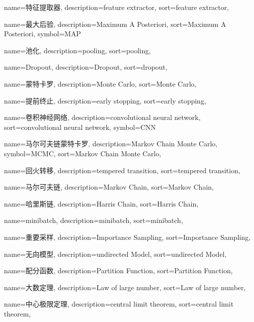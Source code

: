 {
  name=特征提取器,
  description={feature extractor},
  sort={feature extractor},
}

{
  name=最大后验,
  description={Maximum A Posteriori},
  sort={Maximum A Posteriori},
  symbol={MAP}
}

{
  name=池化,
  description={pooling},
  sort={pooling},
}

{
  name=Dropout,
  description={Dropout},
  sort={dropout},
}

{
  name=蒙特卡罗,
  description={Monte Carlo},
  sort={Monte Carlo},
}

{
  name=提前终止,
  description={early stopping},
  sort={early stopping},
}

{
  name=卷积神经网络,
  description={convolutional neural network},
  sort={convolutional neural network},
  symbol={CNN}
}

{
  name=马尔可夫链蒙特卡罗,
  description={Markov Chain Monte Carlo},
  symbol={MCMC},
  sort={Markov Chain Monte Carlo},
}

{
  name=回火转移,
  description={tempered transition},
  sort={tempered transition},
}

{
  name=马尔可夫链,
  description={Markov Chain},
  sort={Markov Chain},
}

{
  name=哈里斯链,
  description={Harris Chain},
  sort={Harris Chain},
}

{
  name=minibatch,
  description={minibatch},
  sort={minibatch},
}

{
  name=重要采样,
  description={Importance Sampling},
  sort={Importance Sampling},
}

{
  name=无向模型,
  description={undirected Model},
  sort={undirected Model},
}

{
  name=配分函数,
  description={Partition Function},
  sort={Partition Function},
}

{
  name=大数定理,
  description={Law of large number},
  sort={Law of large number},
}

{
  name=中心极限定理,
  description={central limit theorem},
  sort={central limit theorem},
}

